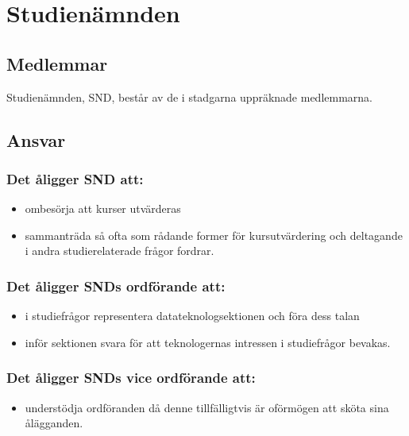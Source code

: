 \section{Studienämnden}
\subsection{Medlemmar}
Studienämnden, SND, består av de i stadgarna uppräknade medlemmarna.
\subsection{Ansvar}
\subsubsection{Det åligger SND att:}
\begin{itemize}
  \item ombesörja att kurser utvärderas
  \item sammanträda så ofta som rådande former för kursutvärdering och deltagande i andra studierelaterade frågor fordrar.
\end{itemize}
\subsubsection{Det åligger SNDs ordförande att:}
\begin{itemize}
  \item i studiefrågor representera datateknologsektionen och föra dess talan
  \item inför sektionen svara för att teknologernas intressen i studiefrågor bevakas.
\end{itemize}
\subsubsection{Det åligger SNDs vice ordförande att:}
\begin{itemize}
  \item understödja ordföranden då denne tillfälligtvis är oförmögen att sköta sina ålägganden.
\end{itemize}
\newpage
